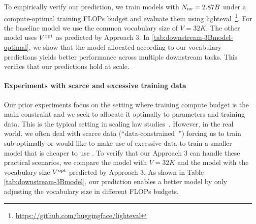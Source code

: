 To empirically verify our prediction, we train models with $N_{\rm nv}=2.87B$ under a compute-optimal training FLOPs budget and evaluate them using lighteval~\footnote{\url{https://github.com/huggingface/lighteval}}. For the baseline model we use the common vocabulary size of $V=32K$. The other model uses $V^{\rm opt}$ as predicted by Approach 3. In \autoref{tab:downstream-3Bmodel-optimal}, we show that the model allocated according to our vocabulary predictions yields better performance across multiple downstream tasks. This verifies that our predictions hold at scale.



\paragraph{Experiments with scarce and excessive training data} Our prior experiments focus on the setting where training compute budget is the main constraint and we seek to allocate it optimally to parameters and training data. This is the typical setting in scaling law studies~\citep{kaplan2020scaling,hoffmann2022training,rae2021scaling}. However, in the real world, we often deal with scarce data (``data-constrained~\citep{muennighoff2024scaling}'') forcing us to train sub-optimally or would like to make use of excessive data to train a smaller model that is cheaper to use \citep{zhang2024tinyllama}. To verify that our Approach 3 can handle these practical scenarios, we compare the model with $V=32K$ and the model with the vocabulary size $V^{\rm opt}$ predicted by Approach 3. As shown in Table \ref{tab:downstream-3Bmodel}, our prediction enables a better model by only adjusting the vocabulary size in different FLOPs budgets.


